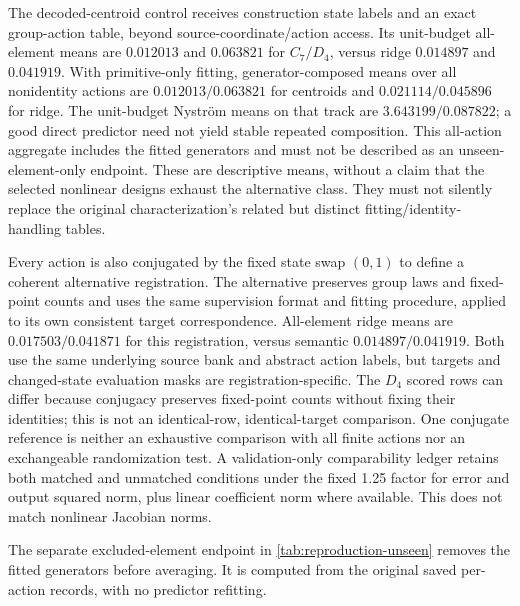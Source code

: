 The decoded-centroid control receives construction state labels and an exact group-action table, beyond source-coordinate/action access. Its unit-budget all-element means are $0.012013$ and $0.063821$ for $C_7/D_4$, versus ridge $0.014897$ and $0.041919$. With primitive-only fitting, generator-composed means over all nonidentity actions are $0.012013/0.063821$ for centroids and $0.021114/0.045896$ for ridge. The unit-budget Nystr\"om means on that track are $3.643199/0.087822$; a good direct predictor need not yield stable repeated composition. This all-action aggregate includes the fitted generators and must not be described as an unseen-element-only endpoint. These are descriptive means, without a claim that the selected nonlinear designs exhaust the alternative class. They must not silently replace the original characterization's related but distinct fitting/identity-handling tables.

Every action is also conjugated by the fixed state swap $(0,1)$ to define a coherent alternative registration. The alternative preserves group laws and fixed-point counts and uses the same supervision format and fitting procedure, applied to its own consistent target correspondence. All-element ridge means are $0.017503/0.041871$ for this registration, versus semantic $0.014897/0.041919$. Both use the same underlying source bank and abstract action labels, but targets and changed-state evaluation masks are registration-specific. The $D_4$ scored rows can differ because conjugacy preserves fixed-point counts without fixing their identities; this is not an identical-row, identical-target comparison. One conjugate reference is neither an exhaustive comparison with all finite actions nor an exchangeable randomization test. A validation-only comparability ledger retains both matched and unmatched conditions under the fixed 1.25 factor for error and output squared norm, plus linear coefficient norm where available. This does not match nonlinear Jacobian norms.


The separate excluded-element endpoint in \cref{tab:reproduction-unseen} removes the fitted generators before averaging. It is computed from the original saved per-action records, with no predictor refitting.

